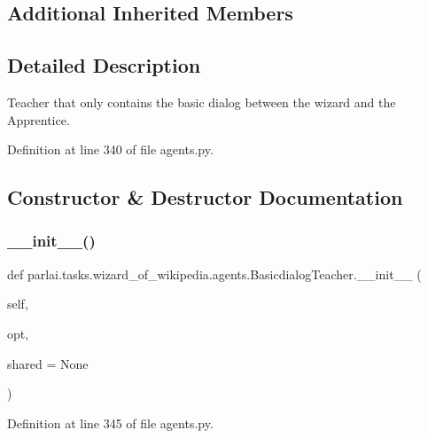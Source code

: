 \subsection*{Additional Inherited Members}


\subsection{Detailed Description}
\begin{DoxyVerb}Teacher that only contains the basic dialog between the wizard and the Apprentice.
\end{DoxyVerb}
 

Definition at line 340 of file agents.\+py.



\subsection{Constructor \& Destructor Documentation}
\mbox{\label{classparlai_1_1tasks_1_1wizard__of__wikipedia_1_1agents_1_1BasicdialogTeacher_a15a3b192484500d616eeac7bcd871cc2}} 
\subsubsection{\texorpdfstring{\+\_\+\+\_\+init\+\_\+\+\_\+()}{\_\_init\_\_()}}
{\footnotesize\ttfamily def parlai.\+tasks.\+wizard\+\_\+of\+\_\+wikipedia.\+agents.\+Basicdialog\+Teacher.\+\_\+\+\_\+init\+\_\+\+\_\+ (\begin{DoxyParamCaption}\item[{}]{self,  }\item[{}]{opt,  }\item[{}]{shared = {\ttfamily None} }\end{DoxyParamCaption})}



Definition at line 345 of file agents.\+py.


